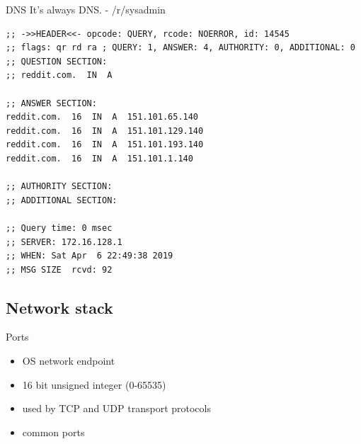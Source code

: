 \documentclass{beamer}
\begin{document}
\begin{frame}[fragile]{DNS}
  It's always DNS. - /r/sysadmin
  \scriptsize
  \begin{lstlisting}
;; ->>HEADER<<- opcode: QUERY, rcode: NOERROR, id: 14545
;; flags: qr rd ra ; QUERY: 1, ANSWER: 4, AUTHORITY: 0, ADDITIONAL: 0
;; QUESTION SECTION:
;; reddit.com.  IN  A

;; ANSWER SECTION:
reddit.com.  16  IN  A  151.101.65.140
reddit.com.  16  IN  A  151.101.129.140
reddit.com.  16  IN  A  151.101.193.140
reddit.com.  16  IN  A  151.101.1.140

;; AUTHORITY SECTION:
;; ADDITIONAL SECTION:

;; Query time: 0 msec
;; SERVER: 172.16.128.1
;; WHEN: Sat Apr  6 22:49:38 2019
;; MSG SIZE  rcvd: 92
  \end{lstlisting}
\end{frame}

\subsection{Network stack}

\begin{frame}{Ports}
  \begin{itemize}
    \item OS network endpoint
    \item 16 bit unsigned integer (0-65535)
    \item used by TCP and UDP transport protocols
    \pause
    \item common ports 
  \end{itemize}
\end{frame}
\end{document}
